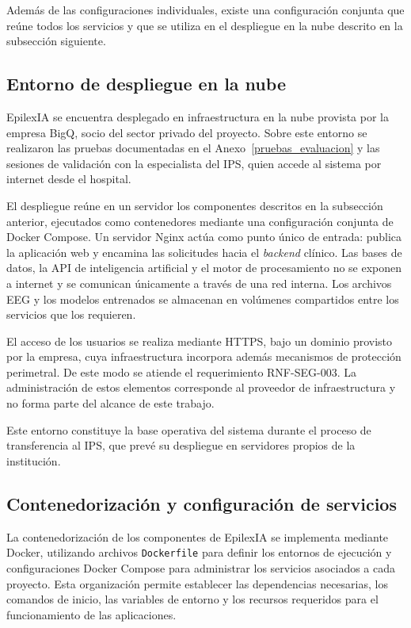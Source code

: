 Además de las configuraciones individuales, existe una configuración conjunta que reúne todos los servicios y que se utiliza en el despliegue en la nube descrito en la subsección siguiente.

\subsection{Entorno de despliegue en la nube}
\label{subsec:despliegue-nube}

EpilexIA se encuentra desplegado en infraestructura en la nube provista por la empresa BigQ, socio del sector privado del proyecto.
Sobre este entorno se realizaron las pruebas documentadas en el Anexo~\ref{pruebas_evaluacion} y las sesiones de validación con la especialista del IPS, quien accede al sistema por internet desde el hospital.

El despliegue reúne en un servidor los componentes descritos en la subsección anterior, ejecutados como contenedores mediante una configuración conjunta de Docker Compose.
Un servidor Nginx actúa como punto único de entrada: publica la aplicación web y encamina las solicitudes hacia el \textit{backend} clínico.
Las bases de datos, la API de inteligencia artificial y el motor de procesamiento no se exponen a internet y se comunican únicamente a través de una red interna.
Los archivos EEG y los modelos entrenados se almacenan en volúmenes compartidos entre los servicios que los requieren.

El acceso de los usuarios se realiza mediante HTTPS, bajo un dominio provisto por la empresa, cuya infraestructura incorpora además mecanismos de protección perimetral.
De este modo se atiende el requerimiento RNF-SEG-003.
La administración de estos elementos corresponde al proveedor de infraestructura y no forma parte del alcance de este trabajo.

Este entorno constituye la base operativa del sistema durante el proceso de transferencia al IPS, que prevé su despliegue en servidores propios de la institución.

\subsection{Contenedorización y configuración de servicios}

La contenedorización de los componentes de EpilexIA se implementa
mediante Docker, utilizando archivos \texttt{Dockerfile} para definir los
entornos de ejecución y configuraciones Docker Compose para
administrar los servicios asociados a cada proyecto. Esta
organización permite establecer las dependencias necesarias,
los comandos de inicio, las variables de entorno y los recursos
requeridos para el funcionamiento de las aplicaciones.

